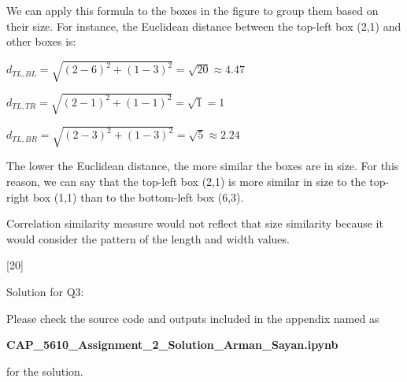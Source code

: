 \documentclass[12pt,letterpaper, onecolumn]{exam}
\begin{document}
\begin{questions}
\begin{parts}
\begin{solution}
            We can apply this formula to the boxes in the figure to group them based on their size. 
            For instance, the Euclidean distance between the top-left box (2,1) and other boxes is:

            \begin{center}
                $\displaystyle{d_{TL,BL} = \sqrt{(2 - 6)^2 + (1 - 3)^2} = \sqrt{20} \approx 4.47}$

                $\displaystyle{d_{TL,TR} = \sqrt{(2 - 1)^2 + (1 - 1)^2} = \sqrt{1} = 1}$

                $\displaystyle{d_{TL,BR} = \sqrt{(2 - 3)^2 + (1 - 3)^2} = \sqrt{5} \approx 2.24}$
            \end{center}

            The lower the Euclidean distance, the more similar the boxes are in size.
            For this reason, we can say that the top-left box (2,1) is more similar in size to the top-right box (1,1) than to the bottom-left box (6,3).

            Correlation similarity measure would not reflect that size similarity because it would consider the pattern of the length and width values.

        \end{solution}
        
    \end{parts}

    \pagebreak

    [20]

    Solution for Q3:


    \begin{solution}

        Please check the source code and outputs included in the appendix named as

        \begin{center}
            \textbf{CAP\_5610\_Assignment\_2\_Solution\_Arman\_Sayan.ipynb}
        \end{center}
        
        for the solution.
    \end{solution}

    \pagebreak



\end{questions}
\end{document}

